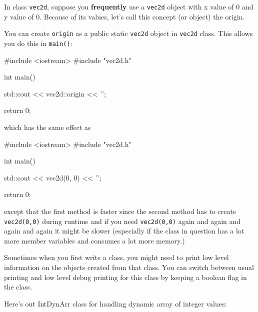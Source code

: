 







\newpage{}

In class \texttt{vec2d}, suppose you \textbf{frequently} use a
\texttt{vec2d} object with x value of 0 and y value of 0. Because of its
values, let's call this concept (or object) the origin.

You can create \texttt{origin} as a public static \texttt{vec2d} object in
\texttt{vec2d} class. This allows you do this in \texttt{main()}:

\begin{consolethree}[escapeinside=||]
#include <iostream>
#include "vec2d.h"

int main()
{
    std::cout << vec2d::origin << '\n';

    return 0;
}
\end{consolethree}

which has the same effect as

\begin{consolethree}[escapeinside=||]
#include <iostream>
#include "vec2d.h"

int main()
{
    std::cout << vec2d(0, 0) << '\n';

    return 0;
}
\end{consolethree}

except that the first method is faster since the second method has to
create \texttt{vec2d(0,0)} during runtime and if you need
\texttt{vec2d(0,0)} again and again and again and again it might be slower
(especially if the class in question has a lot more member variables and
consumes a lot more memory.)



\newpage{}

Sometimes when you first write a class, you might need to print low
level information on the objects created from that class. You can switch
between usual printing and low level debug printing for this class by
keeping a boolean flag in the class.

Here's out IntDynArr class for handling dynamic array of
integer values:

